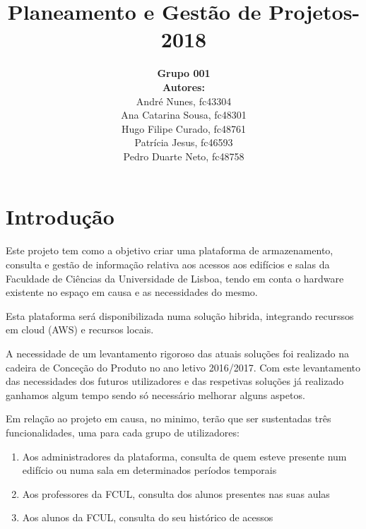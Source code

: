 \documentclass[a4paper]{report}
\begin{document}
\title{\textbf{Planeamento e Gestão de Projetos}\linebreak {}-2018\linebreak {}}
\date{}
\author{
	\textbf{Grupo 001}\\
	\textbf{Autores:}\\
	André Nunes, fc43304\\
	Ana Catarina Sousa, fc48301\\ 
	Hugo Filipe Curado, fc48761\\ 
	Patrícia Jesus, fc46593\\
	Pedro Duarte Neto, fc48758
}
\maketitle
\tableofcontents
\chapter{Introdução}
Este projeto tem como a objetivo criar uma plataforma de armazenamento, consulta e gestão de informação relativa aos acessos aos edifícios e salas da Faculdade de Ciências da Universidade de Lisboa, tendo em conta o hardware existente no espaço em causa e as necessidades do mesmo.

Esta plataforma será disponibilizada numa solução hibrida, integrando recurssos em cloud (AWS) e recursos locais.

A necessidade de um levantamento rigoroso das atuais soluções foi realizado na cadeira de Conceção do Produto no ano letivo 2016/2017. Com este levantamento das necessidades dos futuros utilizadores e das respetivas soluções já realizado ganhamos algum tempo sendo só necessário melhorar alguns aspetos.

Em relação ao projeto em causa, no minimo, terão que ser sustentadas três funcionalidades, uma para cada grupo de utilizadores:
\begin{enumerate}
\item Aos administradores da plataforma, consulta de quem esteve presente num edifício ou numa sala em determinados períodos temporais %
\item Aos professores da FCUL, consulta dos alunos presentes nas suas aulas
\item Aos alunos da FCUL, consulta do seu histórico de acessos
\end{enumerate}
\end{document}
